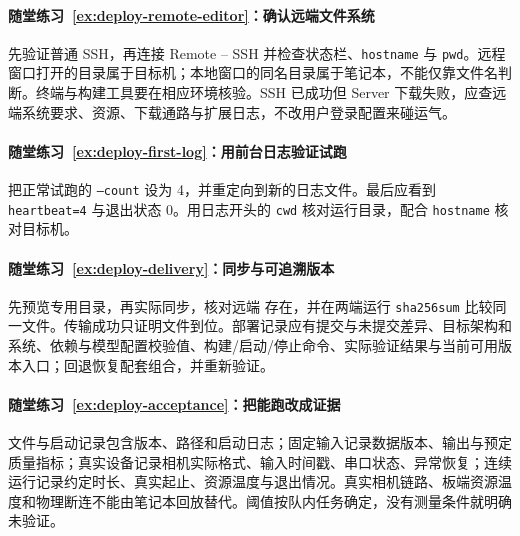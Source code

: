 \paragraph*{随堂练习~\ref{ex:deploy-remote-editor}：确认远端文件系统}
\begin{solution}
先验证普通 SSH，再连接 Remote -- SSH 并检查状态栏、\texttt{hostname} 与 \texttt{pwd}。远程窗口打开的目录属于目标机；本地窗口的同名目录属于笔记本，不能仅靠文件名判断。终端与构建工具要在相应环境核验。SSH 已成功但 Server 下载失败，应查远端系统要求、资源、下载通路与扩展日志，不改用户登录配置来碰运气。
\end{solution}

\paragraph*{随堂练习~\ref{ex:deploy-first-log}：用前台日志验证试跑}
\begin{solution}
把正常试跑的 \texttt{--count} 设为 4，并重定向到新的日志文件。最后应看到 \texttt{heartbeat=4} 与退出状态 0。用日志开头的 \texttt{cwd} 核对运行目录，配合 \texttt{hostname} 核对目标机。
\end{solution}

\paragraph*{随堂练习~\ref{ex:deploy-delivery}：同步与可追溯版本}
\begin{solution}
先预览专用目录，再实际同步，核对远端  存在，并在两端运行 \texttt{sha256sum} 比较同一文件。传输成功只证明文件到位。部署记录应有提交与未提交差异、目标架构和系统、依赖与模型配置校验值、构建/启动/停止命令、实际验证结果与当前可用版本入口；回退恢复配套组合，并重新验证。
\end{solution}

\paragraph*{随堂练习~\ref{ex:deploy-acceptance}：把能跑改成证据}
\begin{solution}
文件与启动记录包含版本、路径和启动日志；固定输入记录数据版本、输出与预定质量指标；真实设备记录相机实际格式、输入时间戳、串口状态、异常恢复；连续运行记录约定时长、真实起止、资源温度与退出情况。真实相机链路、板端资源温度和物理断连不能由笔记本回放替代。阈值按队内任务确定，没有测量条件就明确未验证。
\end{solution}

